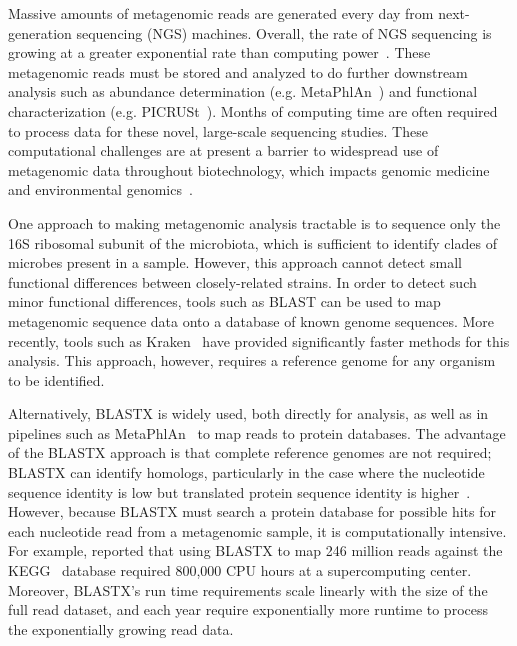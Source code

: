 \documentclass[review,preprint,12pt]{elsarticle}
\renewcommand{\cite}{\citep} %
\theoremstyle{definition}
\theoremstyle{remark}
\numberwithin{equation}{section}
\begin{document}
Massive amounts of metagenomic reads are generated every day from 
next-generation sequencing (NGS) machines.
Overall, the rate of NGS sequencing is growing at a greater exponential rate
than computing power~\cite{loh2012compressive}.
These metagenomic reads must be stored and analyzed to do further downstream
analysis such as abundance determination (e.g. 
MetaPhlAn~\cite{segata2012metagenomic}) 
and functional characterization (e.g. PICRUSt~\cite{langille2013predictive}).
 Months of computing time are often required to process data for these novel, 
large-scale sequencing studies.
These computational challenges are at present a barrier to widespread use of 
metagenomic data throughout biotechnology, which impacts genomic medicine and 
environmental genomics~\cite{frank2008gastrointestinal}.

One approach to making metagenomic analysis tractable is to
sequence only the 16S ribosomal subunit of the microbiota, which is sufficient
to identify clades of microbes present in a sample. 
However, this approach cannot detect small functional differences between 
closely-related strains. 
In order to detect such minor functional differences, tools such as BLAST can 
be used to map metagenomic sequence data onto a database of known genome
sequences.
More recently, tools such as Kraken~\cite{wood2014kraken} have provided 
significantly faster methods for this analysis.
This approach, however, requires a reference genome for any organism to be
identified.

Alternatively, BLASTX is widely used, both directly for analysis, as well as in 
pipelines such as MetaPhlAn~\cite{segata2012metagenomic} to map reads to 
protein databases.
The advantage of the BLASTX approach is that complete reference genomes are not
required; BLASTX can identify homologs, particularly in the case where the
nucleotide sequence identity is low but translated protein sequence identity
is higher~\cite{turnbaugh2006obesity, kurokawa2007comparative}.
However, because BLASTX must search a protein database for possible hits for
each nucleotide read from a metagenomic sample, it is computationally intensive.
For example, \citet{mackelprang2011metagenomic} reported that using BLASTX to 
map 246
million reads against the KEGG~\cite{kanehisa2000kegg} database required 
800,000 CPU hours at a supercomputing center.
Moreover, BLASTX's run time requirements scale linearly with the size of the 
full read dataset, and each year require exponentially more runtime to process 
the exponentially growing read data. 
\end{document}
